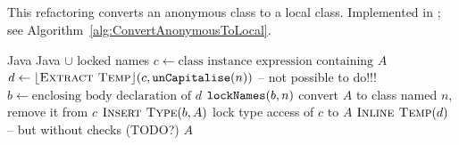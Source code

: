 \subsection{}
This refactoring converts an anonymous class to a local class. Implemented in ; see Algorithm~\ref{alg:ConvertAnonymousToLocal}.


\begin{algorithm}
\caption{$\refactoring{Convert Anonymous to Local}(A : \type{AnonymousClass}, n : \type{Name}) : \type{LocalClass}$}\label{alg:ConvertAnonymousToLocal}
\begin{algorithmic}[1]
\REQUIRE Java
\ENSURE Java $\cup$ locked names
\medskip
\STATE $c \leftarrow \text{class instance expression containing $A$}$
\STATE $d \leftarrow \lfloor\textsc{Extract Temp}\rfloor(c, \text{\texttt{unCapitalise}}(n))$ -- not possible to do!!!
\STATE $b \leftarrow \text{enclosing body declaration of $d$}$
\STATE $\text{\texttt{lockNames}}(b, n)$
\STATE convert $A$ to class named $n$, remove it from $c$
\STATE $\textsc{Insert Type}(b, A)$
\STATE lock type access of $c$ to $A$
\STATE $\textsc{Inline Temp}(d)$ -- but without checks (TODO?)
\RETURN $A$
\end{algorithmic}
\end{algorithm}
